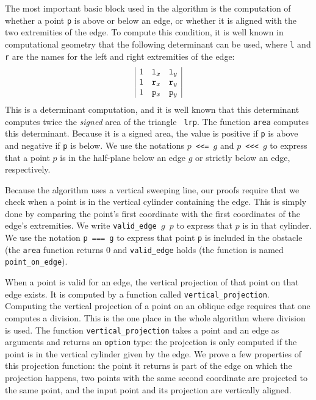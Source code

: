\documentclass[a4paper, USenglish, cleveref, autoref, thm-restate, final]{lipics-v2021}
\begin{document}
The most important basic block used in the algorithm is the
computation of whether a point {\tt p} is above or below an edge, or whether
it is aligned with the two extremities of the edge.  To compute this
condition, it is well known in computational geometry \cite{KnuthAxiomsHulls}
that the
following determinant can be used, where {\tt l} and {\tt r} are the
names for the left and right extremities of the edge:
\[\begin{array}{|ccc|}
1 & {\tt l}_x & {\tt l}_y\\
1 & {\tt r}_x & {\tt r}_y\\
1 & {\tt p}_x & {\tt p}_y\\
\end{array}\]
This is a determinant computation, and it is well known that this
determinant computes twice the {\em signed} area of the triangle {\tt
  lrp}.  The function {\tt area} computes this determinant.
Because it is a signed area, the value is positive if {\tt p}
is above and negative if {\tt p} is below.  We use the notations
{\tt \(p\) <{}<{}= \(g\)} and {\tt \(p\) <{}<{}< \(g\)} to express that a point
\(p\) is in the half-plane below an edge \(g\) or strictly below an
edge, respectively.

Because the algorithm uses a vertical sweeping line, our proofs
require that we check when a point is in the vertical cylinder
containing the edge.  This is simply done by comparing the point's
first coordinate with the first coordinates of the edge's extremities.
We write {\tt valid\_edge \(g\) \(p\)} to express that \(p\) is in
that cylinder.  We use the notation {\tt p === g} to express that
point {\tt p} is included in the obstacle (the {\tt area} function
returns 0 and {\tt valid\_edge} holds (the function is named
{\tt point\_on\_edge}).

When a point is valid for an edge, the vertical projection of that
point on that edge exists.  It is computed by a function called
{\tt vertical\_projection}.  Computing the vertical projection of a
point on an oblique edge requires that one computes a division. This
is the one place in the whole algorithm where division is used.
The function {\tt vertical\_projection} takes a point and an edge as
arguments and returns an {\tt option} type:
the projection is only computed if the point is in the vertical
cylinder given by the edge.  We prove a few properties of this
projection function: the point it returns is part of the edge on which
the projection happens, two points with the same second coordinate are
projected to the same point, and the input point and its projection
are vertically aligned.
\end{document}
